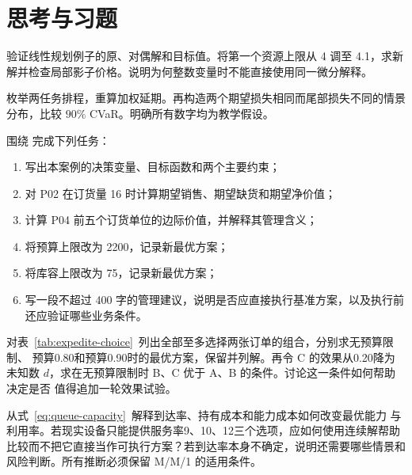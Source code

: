 
\section*{思考与习题}

\begin{exercise}[证书与成本]
验证线性规划例子的原、对偶解和目标值。将第一个资源上限从 4 调至 4.1，求新解并检查局部影子价格。说明为何整数变量时不能直接使用同一微分解释。
\end{exercise}
\begin{exercise}[排程与风险]
枚举两任务排程，重算加权延期。再构造两个期望损失相同而尾部损失不同的情景分布，比较 \(90\%\) CVaR。明确所有数字均为教学假设。
\end{exercise}

\begin{exercise}
围绕  完成下列任务：
\begin{enumerate}
  \item 写出本案例的决策变量、目标函数和两个主要约束；
  \item 对 P02 在订货量 16 时计算期望销售、期望缺货和期望净价值；
  \item 计算 P04 前五个订货单位的边际价值，并解释其管理含义；
  \item 将预算上限改为 2200，记录新最优方案；
  \item 将库容上限改为 75，记录新最优方案；
  \item 写一段不超过 400 字的管理建议，说明是否应直接执行基准方案，以及执行前还应验证哪些业务条件。
\end{enumerate}
\end{exercise}

\begin{exercise}[加急组合与边界条件]
对表~\ref{tab:expedite-choice}~列出全部至多选择两张订单的组合，分别求无预算限制、
预算0.80和预算0.90时的最优方案，保留并列解。再令 C 的效果从0.20降为未知数
\(d\)，求在无预算限制时 B、C 优于 A、B 的条件。讨论这一条件如何帮助决定是否
值得追加一轮效果试验。
\end{exercise}

\begin{exercise}[由运营模型反推产能]
从式~\eqref{eq:queue-capacity}~解释到达率、持有成本和能力成本如何改变最优能力
与利用率。若现实设备只能提供服务率9、10、12三个选项，应如何使用连续解帮助
比较而不把它直接当作可执行方案？若到达率本身不确定，说明还需要哪些情景和
风险判断。所有推断必须保留 M/M/1 的适用条件。
\end{exercise}
